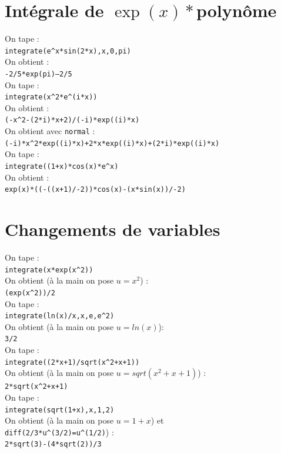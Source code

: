 \documentclass[a4paper,11pt]{book}
\begin{document}
\section{Int\'egrale de $\exp(x)*$polyn\^ome}
\noindent On tape :\\
{\tt integrate(e\verb|^|x*sin(2*x),x,0,pi)}\\   
On obtient :\\
{\tt -2/5*exp(pi)--2/5}\\
On tape :\\
{\tt integrate(x\verb|^|2*e\verb|^|(i*x))}\\   
On obtient :\\
{\tt (-x\verb|^|2-(2*i)*x+2)/(-i)*exp((i)*x)}\\
On obtient avec {\tt normal} :\\
{\tt (-i)*x\verb|^|2*exp((i)*x)+2*x*exp((i)*x)+(2*i)*exp((i)*x)}\\
On tape :\\
{\tt  integrate((1+x)*cos(x)*e\verb|^|x)}\\   
On obtient :\\
{\tt exp(x)*((-((x+1)/-2))*cos(x)-(x*sin(x))/-2)}
\section{Changements de variables}
\noindent On tape :\\
{\tt  integrate(x*exp(x\verb|^|2))}\\   
On obtient (\`a la main on pose $u=x^2$) :\\
{\tt (exp(x\verb|^|2))/2}\\
On tape :\\
{\tt integrate(ln(x)/x,x,e,e\verb|^|2)}\\   
On obtient (\`a la main on pose $u=ln(x)$):\\
{\tt 3/2}\\
On tape :\\
{\tt integrate((2*x+1)/sqrt(x\verb|^|2+x+1))}\\   
On obtient (\`a la main on pose $u=sqrt(x^2+x+1)$) :\\
{\tt 2*sqrt(x\verb|^|2+x+1)}\\
On tape :\\
{\tt integrate(sqrt(1+x),x,1,2)}\\   
On obtient (\`a la main on pose $u=1+x$) et \\
{\tt diff(2/3*u\verb|^|(3/2)=u\verb|^|(1/2)}) :\\
{\tt 2*sqrt(3)-(4*sqrt(2))/3}
\end{document}
